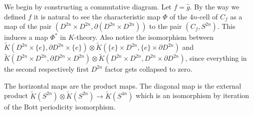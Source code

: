 \documentclass[../Thesis.tex]{subfiles}
\begin{document}
\begin{myproof}
We begin by constructing a commutative diagram. Let $f = \hat{g}$. By the way we defined $f$ it is natural to see the characteristic map $\Phi$ of the $4n$-cell of $C_f$ as a map of the pair $(D^{2n} \times D^{2n}, \partial(D^{2n} \times D^{2n}))$ to the pair $(C_f, S^{2n})$. This induces a map $\Phi^*$ in $K$-theory. Also notice the isomorphism between
$\tilde{K}(D^{2n} \times \{e\}, \partial D^{2n} \times \{ e\} ) \otimes \tilde{K}(\{e\} \times D^{2n}, \{e\} \times \partial D^{2n})$ and $\tilde{K}(D^{2n}\times D^{2n}, \partial D^{2n} \times D^{2n}) \otimes \tilde{K}(D^{2n} \times D^{2n}, D^{2n} \times \partial D^{2n})$, since everything in the second respectively first $D^{2n}$ factor gets collapsed to zero.
 \\    
The horizontal maps are the product maps. The diagonal map is the external product $\tilde{K}(S^{2n}) \otimes \tilde{K}(S^{2n}) \rightarrow \tilde{K}(S^{4n})$ which is an isomorphism by iteration of the Bott periodicity isomorphism.

\end{myproof}
\end{document}
